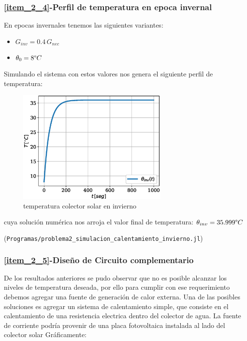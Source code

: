 \subsubsection{\ref{item_2_4}-Perfil de temperatura en epoca invernal}
En epocas invernales tenemos las siguientes variantes:

\begin{itemize}
   \item $G_{inv}=0.4\,G_{nec}$
   \item $\theta_{0} = 8 \degree C$
\end{itemize}
Simulando el sistema con estos valores nos genera el siguiente perfil de temperatura:

\begin{figure}[H]
   \centering
   \includegraphics[width=0.67\textwidth]{Images/temperatura_colector_invierno.eps}
   \caption{temperatura colector solar en invierno}\label{fig:colector_temperatura_invierno}
\end{figure}

cuya solución numérica nos arroja el valor final de temperatura: $\theta_{inv} = 35.999 \degree C$

(\verb|Programas/problema2_simulacion_calentamiento_invierno.jl|)

\subsubsection{\ref{item_2_5}-Diseño de Circuito complementario}
De los resultados anteriores se pudo observar que no es posible alcanzar los niveles de temperatura
deseada, por ello para cumplir con ese requerimiento debemos agregar una fuente de generación de
calor externa. Una de las posibles soluciones es agregar un sistema de calentamiento simple, que
consiste en el calentamiento de una resistencia electrica dentro del colector de agua. La fuente
de corriente podría provenir de una placa fotovoltaica instalada al lado del colector solar
Gráficamente:

